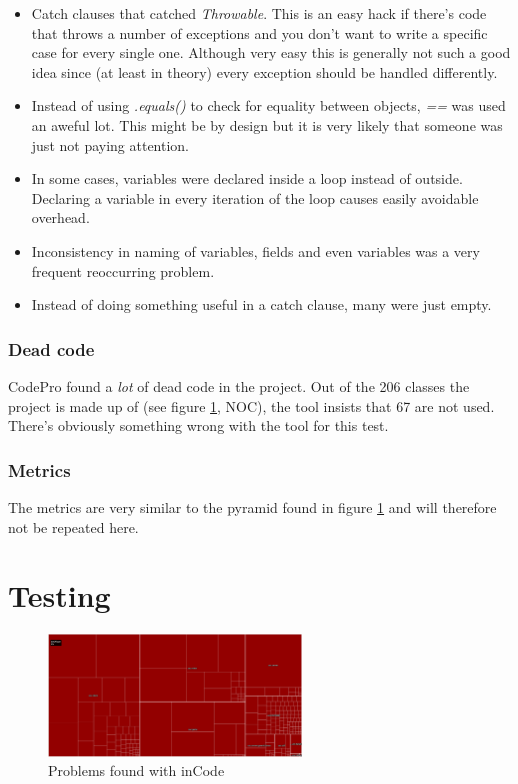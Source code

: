 \documentclass[pdftex12pt, a4paper]{article}
\begin{document}
\begin{itemize}
\item Catch clauses that catched \emph{Throwable}.
This is an easy hack if there's code that throws a number of exceptions and you don't want to write a specific case for every single one.
Although very easy this is generally not such a good idea since (at least in theory) every exception should be handled differently.
\item Instead of using \emph{.equals()} to check for equality between objects, \emph{==} was used an aweful lot.
This might be by design but it is very likely that someone was just not paying attention.
\item In some cases, variables were declared inside a loop instead of outside.
Declaring a variable in every iteration of the loop causes easily avoidable overhead.
\item Inconsistency in naming of variables, fields and even variables was a very frequent reoccurring problem.
\item Instead of doing something useful in a catch clause, many were just empty.
\end{itemize}

\subsubsection{Dead code}

CodePro found a \emph{lot} of dead code in the project.
Out of the 206 classes the project is made up of (see figure \ref{fig:incodeTriangle}, NOC), the tool insists that 67 are not used.
There's obviously something wrong with the tool for this test.

\subsubsection{Metrics}

The metrics are very similar to the pyramid found in figure \ref{fig:incodeTriangle} and will therefore not be repeated here.


\newpage

\section{Testing}

\begin{figure}
\begin{center}
\includegraphics[width=0.6\textwidth]{Image/Testing/clover.png}
\caption{Problems found with inCode}
\label{fig:incodeTriangle}
\end{center}
\end{figure}
\end{document}
